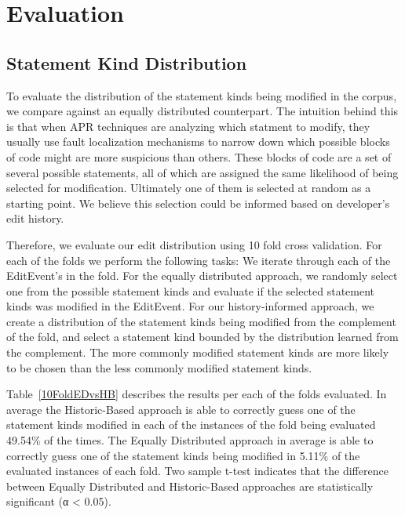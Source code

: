 \documentclass[sigconf]{acmart}
\begin{document}
\section{Evaluation}
\label{eval}

\subsection{Statement Kind Distribution}
To evaluate the distribution of the statement kinds being modified
in the corpus, we compare against an equally distributed counterpart.
The intuition behind this is that when APR techniques are analyzing 
which statment to modify, they usually use fault localization 
mechanisms to narrow down which possible blocks of code might are
more suspicious than others. These blocks of code are 
a set of several possible statements, all of which are assigned
the same likelihood of being selected for modification.
Ultimately one of them is selected at random as a starting point.
We believe this selection could be informed based on developer's
edit history.

Therefore, we evaluate our edit distribution using 10 fold
cross validation. For each of the folds we perform the following
tasks:
We iterate through each of the EditEvent's in the fold. For
the equally distributed approach, we randomly select one from 
the possible statement kinds and evaluate if the selected
statement kinds was modified in the EditEvent.
For our history-informed approach, we create a distribution
of the statement kinds being modified from the complement of the fold, 
and select a statement
kind bounded by the distribution 
learned from the complement. The more commonly modified statement
kinds are more likely to be chosen than the less commonly modified
statement kinds.

Table~\ref{10FoldEDvsHB} describes the results per each of the folds evaluated.
In average 
the Historic-Based approach is able to correctly guess one of  the statement kinds modified
in each of the instances of the fold being evaluated 49.54\% of the times. The Equally Distributed approach
in average is able to correctly guess one of the statement kinds being modified in 5.11\% 
of the evaluated instances of each fold.
Two sample t-test indicates that the difference between Equally Distributed and Historic-Based approaches are statistically significant (α < 0.05).
\end{document}
